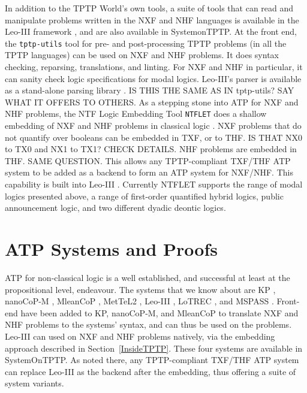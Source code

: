 \documentclass[runningheads]{llncs}
\begin{document}
In addition to the TPTP World's own tools, a suite of tools that can read and manipulate 
problems written in the NXF and NHF languages is available in the Leo-III framework \cite{SB21},
and are also available in SystemonTPTP.
At the front end, the {\tt tptp-utils} tool \cite{Ste22-TU} for pre- and post-processing TPTP 
problems (in all the TPTP languages) can be used on NXF and NHF problems.
It does syntax checking, reparsing, translations, and linting.
For NXF and NHF in particular, it can sanity check logic specifications for modal logics.
Leo-III's parser is available as a stand-alone parsing library \cite{Ste21}.
IS THIS THE SAME AS IN tptp-utils? SAY WHAT IT OFFERS TO OTHERS.
As a stepping stone into ATP for NXF and NHF problems, the NTF Logic Embedding Tool {\tt NTFLET} 
\cite{Ste22-LE} does a shallow embedding of NXF and NHF problems in classical logic 
\cite{BP13,BR13,GSB17,GS18}.
NXF problems that do not quantify over booleans can be embedded in TXF, or to THF.
IS THAT NX0 to TX0 and NX1 to TX1? CHECK DETAILS.
NHF problems are embedded in THF. SAME QUESTION.
This allows any TPTP-compliant TXF/THF ATP system to be added as a backend to form an 
ATP system for NXF/NHF.
This capability is built into Leo-III \cite{WHAT}.
Currently NTFLET supports the range of modal logics presented above, a range of first-order
quantified hybrid logics, public announcement logic, and two different dyadic deontic logics.

\section{ATP Systems and Proofs}
\label{ATPSystems}

ATP for non-classical logic is a well established, and successful at least at the propositional
level, endeavour.
The systems that we know about are
K\raisebox{-3pt}{S}P \cite{NHD20,PN+21}, nanoCoP-M \cite{Ott21}, MleanCoP \cite{Ott14}, 
MetTeL2 \cite{TSK12}, Leo-III \cite{SB21}, LoTREC \cite{FF+01}, and MSPASS \cite{HS00-TABLEAUX}.
Front-end have been added to K\raisebox{-3pt}{S}P, nanoCoP-M, and MleanCoP to translate NXF
and NHF problems to the systems' syntax, and can thus be used on the problems.
Leo-III can used on NXF and NHF problems natively, via the embedding approach described in 
Section~\ref{InsideTPTP}.
These four systems are available in SystemOnTPTP.
As noted there, any TPTP-compliant TXF/THF ATP system can replace Leo-III as the backend after
the embedding, thus offering a suite of system variants.
\end{document}
